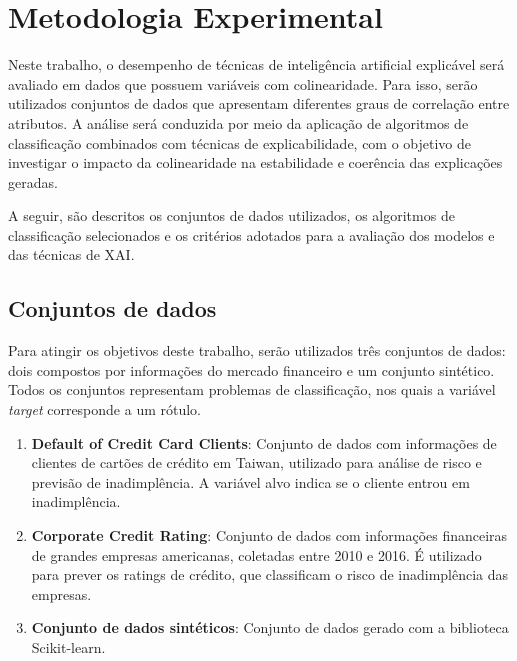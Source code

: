 
\chapter[Metodologia Experimental]{Metodologia Experimental}

Neste trabalho, o desempenho de técnicas de inteligência artificial
explicável será avaliado em dados que possuem variáveis com colinearidade. Para isso, serão utilizados conjuntos de dados que apresentam diferentes graus de correlação entre atributos. A análise será conduzida por meio da aplicação de algoritmos de classificação combinados com técnicas de explicabilidade, com o objetivo de investigar o impacto da colinearidade na estabilidade e coerência das explicações geradas. 

A seguir, são descritos os conjuntos de dados utilizados, os algoritmos de classificação selecionados e os critérios adotados para a avaliação dos modelos e das técnicas de XAI.


\section{Conjuntos de dados}\label{sec:dados}

Para atingir os objetivos deste trabalho, serão utilizados três conjuntos de dados: dois compostos por informações do mercado financeiro e um conjunto sintético. Todos os conjuntos representam problemas de classificação, nos quais a variável \textit{target} corresponde a um rótulo.

\begin{enumerate}
    \item \textbf{Default of Credit Card Clients}: Conjunto de dados com informações de clientes de cartões de crédito em Taiwan, utilizado para análise de risco e previsão de inadimplência. A variável alvo indica se o cliente entrou em inadimplência.

    \item \textbf{Corporate Credit Rating}: Conjunto de dados com informações financeiras de grandes empresas americanas, coletadas entre 2010 e 2016. É utilizado para prever os ratings de crédito, que classificam o risco de inadimplência das empresas.

    \item \textbf{Conjunto de dados sintéticos}: Conjunto de dados gerado com a biblioteca Scikit-learn.
\end{enumerate}

